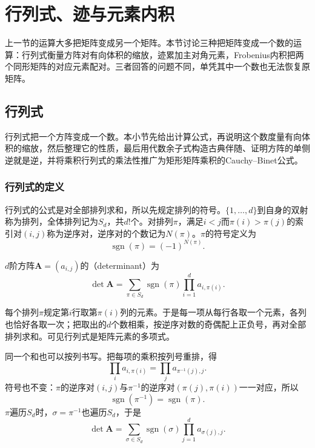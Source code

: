 \section{行列式、迹与元素内积}
\label{sec:ls-matrix-scalar-readouts}

上一节的运算大多把矩阵变成另一个矩阵。本节讨论三种把矩阵变成一个数的运算：行列式衡量方阵对有向体积的缩放，迹累加主对角元素，Frobenius内积把两个同形矩阵的对应元素配对。三者回答的问题不同，单凭其中一个数也无法恢复原矩阵。

\subsection{行列式}
\label{sec:ls-exterior-determinants}
\label{sec:linear-algebra-scalar-readouts}
\label{sec:ls-determinant-properties}
\label{sec:prelim-determinants}

行列式把一个方阵变成一个数。本小节先给出计算公式，再说明这个数度量有向体积的缩放，然后整理它的性质，最后用代数余子式构造古典伴随、证明方阵的单侧逆就是逆，并将乘积行列式的乘法性推广为矩形矩阵乘积的Cauchy--Binet公式。

\subsubsection{行列式的定义}

行列式的公式是对全部排列求和，所以先规定排列的符号。$\{1,\ldots,d\}$到自身的双射称为排列，全体排列记为$S_d$，共$d!$个。对排列$\pi$，满足$i<j$而$\pi(i)>\pi(j)$的索引对$(i,j)$称为逆序对，逆序对的个数记为$N(\pi)$。$\pi$的符号定义为
\[
 \operatorname{sgn}(\pi)=(-1)^{N(\pi)}.
\]
\begin{definition}[行列式]
\label{def:ls-determinant}
$d$阶方阵$\bm A=(a_{i,j})$的（determinant）为
\begin{equation}
 \det\bm A
 =\sum_{\pi\in S_d}\operatorname{sgn}(\pi)
   \prod_{i=1}^d a_{i,\pi(i)}.
 \label{eq:ls-determinant}
\end{equation}
\end{definition}
每个排列$\pi$规定第$i$行取第$\pi(i)$列的元素。于是每一项从每行各取一个元素，各列也恰好各取一次；把取出的$d$个数相乘，按逆序对数的奇偶配上正负号，再对全部排列求和。可见行列式是矩阵元素的多项式。

同一个和也可以按列书写。把每项的乘积按列号重排，得
\[
 \prod_ia_{i,\pi(i)}=\prod_ja_{\pi^{-1}(j),j}.
\]
符号也不变：$\pi$的逆序对$(i,j)$与$\pi^{-1}$的逆序对$(\pi(j),\pi(i))$一一对应，所以
\[
 \operatorname{sgn}(\pi^{-1})=\operatorname{sgn}(\pi).
\]
$\pi$遍历$S_d$时，$\sigma=\pi^{-1}$也遍历$S_d$，于是
\begin{equation}
 \det\bm A=\sum_{\sigma\in S_d}\operatorname{sgn}(\sigma)\prod_{j=1}^d a_{\sigma(j),j}.
 \label{eq:ls-det-column-form}
\end{equation}

